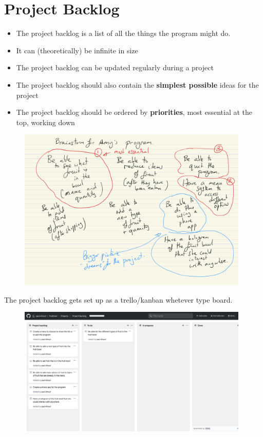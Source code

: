 \documentclass[a4paper,12pt]{article}
\begin{document}
	\section{Project Backlog}
	\begin{itemize}
		\item The project backlog is a list of all the things the program might do.
		\item It can (theoretically) be infinite in size
		\item The project backlog can be updated regularly during a project
		\item The project backlog should also contain the \textbf{simplest possible} ideas for the project
		\item The project backlog should be ordered by \textbf{priorities}, most essential at the top, working down
	\end{itemize}
\begin{figure}[!ht]
	\centering
	\includegraphics[width=11cm]{brainstorm_plan.pdf}
\end{figure}

The project backlog gets set up as a trello/kanban whetever type board.
\begin{figure}[!ht]
	\centering
	\includegraphics[width=11cm]{Project_backlog.png}
\end{figure}
	
\end{document}
